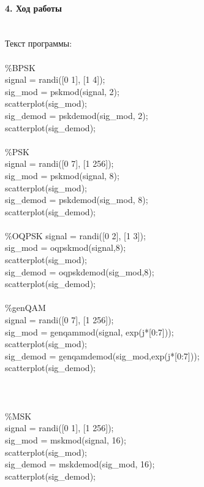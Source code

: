 \documentclass[12pt,a4paper]{report}
\begin{document}
\paragraph{4. Ход работы \\\\}
Текст программы:\\\\
\%BPSK\\
signal = randi([0 1], [1 4]);\\
sig\_mod = pskmod(signal, 2);\\
scatterplot(sig\_mod);\\
sig\_demod = pskdemod(sig\_mod, 2);\\
scatterplot(sig\_demod);\\\\
\%PSK\\
signal = randi([0 7], [1 256]);\\
sig\_mod = pskmod(signal, 8);\\
scatterplot(sig\_mod);\\
sig\_demod = pskdemod(sig\_mod, 8);\\
scatterplot(sig\_demod);\\\\
\%OQPSK
signal = randi([0 2], [1 3]);\\
sig\_mod = oqpskmod(signal,8);\\
scatterplot(sig\_mod);\\
sig\_demod = oqpskdemod(sig\_mod,8);\\
scatterplot(sig\_demod);\\\\
\%genQAM\\
signal = randi([0 7], [1 256]);\\
sig\_mod = genqammod(signal, exp(j*[0:7]));\\
scatterplot(sig\_mod);\\
sig\_demod = genqamdemod(sig\_mod,exp(j*[0:7]));\\
scatterplot(sig\_demod);\\\\\\\\
\%MSK\\
signal = randi([0 1], [1 256]);\\
sig\_mod = mskmod(signal, 16);\\
scatterplot(sig\_mod);\\
sig\_demod = mskdemod(sig\_mod, 16);\\
scatterplot(sig\_demod);\\
\end{document}
